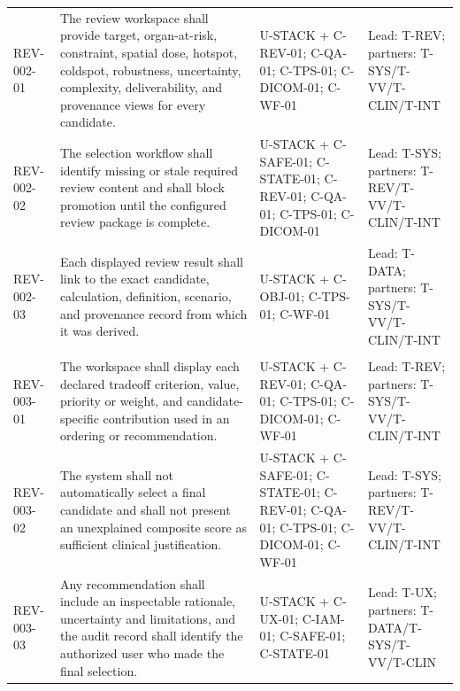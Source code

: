 \documentclass[11pt,letterpaper]{article}
\begin{document}
\begin{scriptsize}
\begin{longtable}{@{}L{0.115\textwidth}L{0.345\textwidth}L{0.265\textwidth}L{0.195\textwidth}@{}}
\addlinespace[2pt]
\mbox{REV-002-01} & The review workspace shall provide target, organ-at-risk, constraint, spatial dose, hotspot, coldspot, robustness, uncertainty, complexity, deliverability, and provenance views for every candidate. & U-STACK + C-REV-01; C-QA-01; C-TPS-01; C-DICOM-01; C-WF-01 & Lead: T-REV; partners: T-SYS\slash\allowbreak{}T-VV\slash\allowbreak{}T-CLIN\slash\allowbreak{}T-INT \\
\addlinespace[2pt]
\mbox{REV-002-02} & The selection workflow shall identify missing or stale required review content and shall block promotion until the configured review package is complete. & U-STACK + C-SAFE-01; C-STATE-01; C-REV-01; C-QA-01; C-TPS-01; C-DICOM-01 & Lead: T-SYS; partners: T-REV\slash\allowbreak{}T-VV\slash\allowbreak{}T-CLIN\slash\allowbreak{}T-INT \\
\addlinespace[2pt]
\mbox{REV-002-03} & Each displayed review result shall link to the exact candidate, calculation, definition, scenario, and provenance record from which it was derived. & U-STACK + C-OBJ-01; C-TPS-01; C-WF-01 & Lead: T-DATA; partners: T-SYS\slash\allowbreak{}T-VV\slash\allowbreak{}T-CLIN\slash\allowbreak{}T-INT \\
\addlinespace[2pt]
 \\
\addlinespace[2pt]
\mbox{REV-003-01} & The workspace shall display each declared tradeoff criterion, value, priority or weight, and candidate-specific contribution used in an ordering or recommendation. & U-STACK + C-REV-01; C-QA-01; C-TPS-01; C-DICOM-01; C-WF-01 & Lead: T-REV; partners: T-SYS\slash\allowbreak{}T-VV\slash\allowbreak{}T-CLIN\slash\allowbreak{}T-INT \\
\addlinespace[2pt]
\mbox{REV-003-02} & The system shall not automatically select a final candidate and shall not present an unexplained composite score as sufficient clinical justification. & U-STACK + C-SAFE-01; C-STATE-01; C-REV-01; C-QA-01; C-TPS-01; C-DICOM-01; C-WF-01 & Lead: T-SYS; partners: T-REV\slash\allowbreak{}T-VV\slash\allowbreak{}T-CLIN\slash\allowbreak{}T-INT \\
\addlinespace[2pt]
\mbox{REV-003-03} & Any recommendation shall include an inspectable rationale, uncertainty and limitations, and the audit record shall identify the authorized user who made the final selection. & U-STACK + C-UX-01; C-IAM-01; C-SAFE-01; C-STATE-01 & Lead: T-UX; partners: T-DATA\slash\allowbreak{}T-SYS\slash\allowbreak{}T-VV\slash\allowbreak{}T-CLIN \\

\end{longtable}
\end{scriptsize}
\end{document}
